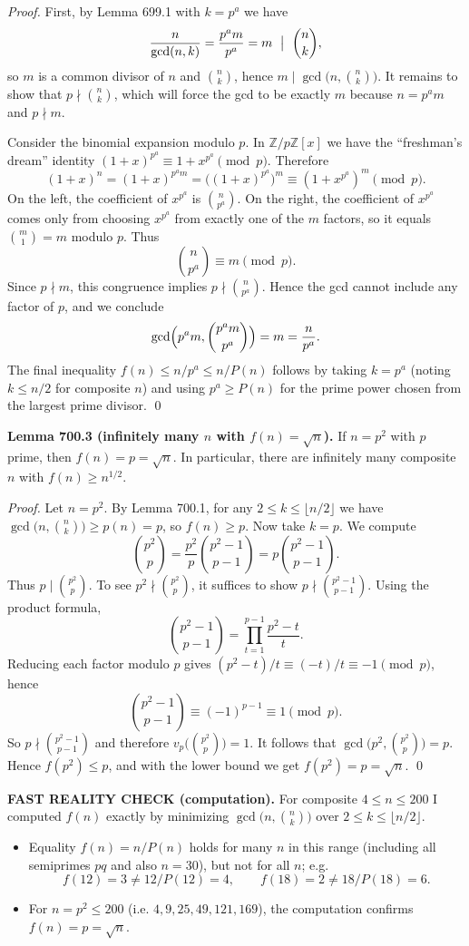 \emph{Proof.}
First, by Lemma 699.1 with $k=p^a$ we have
\[\frac{n}{\gcd(n,k)}=\frac{p^a m}{p^a}=m\ \bigm|\ \binom{n}{k},
\]
so $m$ is a common divisor of $n$ and $\binom{n}{k}$, hence $m\mid\gcd\bigl(n,\binom{n}{k}\bigr)$.
It remains to show that $p\nmid \binom{n}{k}$, which will force the gcd to be exactly $m$ because $n=p^a m$ and $p\nmid m$.

Consider the binomial expansion modulo $p$.
In $\mathbb{Z}/p\mathbb{Z}[x]$ we have the ``freshman's dream'' identity $(1+x)^{p^a}\equiv 1+x^{p^a}\pmod p$.
Therefore
\[(1+x)^n=(1+x)^{p^a m}=\bigl((1+x)^{p^a}\bigr)^m\equiv (1+x^{p^a})^m\pmod p.
\]
On the left, the coefficient of $x^{p^a}$ is $\binom{n}{p^a}$. On the right, the coefficient of $x^{p^a}$ comes only from choosing $x^{p^a}$ from exactly one of the $m$ factors, so it equals $\binom{m}{1}=m$ modulo $p$.
Thus
\[\binom{n}{p^a}\equiv m\pmod p.
\]
Since $p\nmid m$, this congruence implies $p\nmid \binom{n}{p^a}$. Hence the gcd cannot include any factor of $p$, and we conclude
\[\gcd\Bigl(p^a m,\binom{p^a m}{p^a}\Bigr)=m=\frac{n}{p^a}.
\]
The final inequality $f(n)\le n/p^a\le n/P(n)$ follows by taking $k=p^a$ (noting $k\le n/2$ for composite $n$) and using $p^a\ge P(n)$ for the prime power chosen from the largest prime divisor. \qed

\medskip
\textbf{Lemma 700.3 (infinitely many $n$ with $f(n)=\sqrt{n}$).}
If $n=p^2$ with $p$ prime, then $f(n)=p=\sqrt{n}$. In particular, there are infinitely many composite $n$ with $f(n)\ge n^{1/2}$.

\emph{Proof.}
Let $n=p^2$. By Lemma 700.1, for any $2\le k\le \lfloor n/2\rfloor$ we have
$\gcd\bigl(n,\binom{n}{k}\bigr)\ge p(n)=p$, so $f(n)\ge p$.
Now take $k=p$. We compute
\[\binom{p^2}{p}=\frac{p^2}{p}\binom{p^2-1}{p-1}=p\binom{p^2-1}{p-1}.
\]
Thus $p\mid \binom{p^2}{p}$. To see $p^2\nmid \binom{p^2}{p}$, it suffices to show $p\nmid \binom{p^2-1}{p-1}$. Using the product formula,
\[\binom{p^2-1}{p-1}=\prod_{t=1}^{p-1}\frac{p^2-t}{t}.
\]
Reducing each factor modulo $p$ gives $(p^2-t)/t\equiv (-t)/t\equiv -1\pmod p$, hence
\[\binom{p^2-1}{p-1}\equiv (-1)^{p-1}\equiv 1\pmod p.
\]
So $p\nmid \binom{p^2-1}{p-1}$ and therefore $v_p\bigl(\binom{p^2}{p}\bigr)=1$. It follows that
$\gcd\bigl(p^2,\binom{p^2}{p}\bigr)=p$.
Hence $f(p^2)\le p$, and with the lower bound we get $f(p^2)=p=\sqrt{n}$. \qed

\medskip
\textbf{FAST REALITY CHECK (computation).}
For composite $4\le n\le 200$ I computed $f(n)$ exactly by minimizing $\gcd\bigl(n,\binom{n}{k}\bigr)$ over $2\le k\le \lfloor n/2\rfloor$.
\begin{itemize}
\item Equality $f(n)=n/P(n)$ holds for many $n$ in this range (including all semiprimes $pq$ and also $n=30$), but not for all $n$; e.g.
  \[f(12)=3\ne 12/P(12)=4,\qquad f(18)=2\ne 18/P(18)=6.
  \]
\item For $n=p^2\le 200$ (i.e. $4,9,25,49,121,169$), the computation confirms $f(n)=p=\sqrt{n}$.
\end{itemize}

